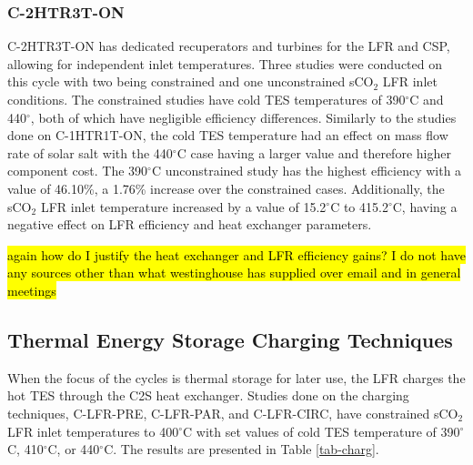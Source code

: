 \begin{paracol}{2}
\subsubsection{C-2HTR3T-ON}
C-2HTR3T-ON has dedicated recuperators and turbines for the LFR and CSP, allowing for independent inlet temperatures. Three studies were conducted on this cycle with two being constrained and one unconstrained sCO$_2$ LFR inlet conditions. The constrained studies have cold TES temperatures of 390$^{\circ}$C and 440$^{\circ}$, both of which have negligible efficiency differences. Similarly to the studies done on C-1HTR1T-ON, the cold TES temperature had an effect on mass flow rate of solar salt with the 440$^{\circ}$C case having a larger value and therefore higher component cost. The 390$^{\circ}$C unconstrained study has the highest efficiency with a value of 46.10\%, a 1.76\% increase over the constrained cases. Additionally, the sCO$_2$ LFR inlet temperature increased by a value of 15.2$^{\circ}$C to 415.2$^{\circ}$C, having a negative effect on LFR efficiency and heat exchanger parameters. 

\hl{again how do I justify the heat exchanger and LFR efficiency gains? I do not have any sources other than what westinghouse has supplied over email and in general meetings}

\subsection{Thermal Energy Storage Charging Techniques}

When the focus of the cycles is thermal storage for later use, the LFR charges the hot TES through the C2S heat exchanger. Studies done on the charging techniques, C-LFR-PRE, C-LFR-PAR, and C-LFR-CIRC, have constrained sCO$_2$ LFR inlet temperatures to 400$^{\circ}$C with set values of cold TES temperature of 390$^{\circ}$C, 410$^{\circ}$C, or 440$^{\circ}$C. The results are presented in Table \ref{tab-charg}. 

\end{paracol}
